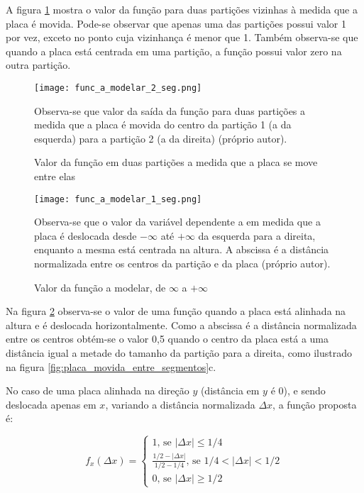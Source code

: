 A figura \ref{fig:func_a_modelar_2_seg} mostra o valor da função para
duas partições vizinhas à medida que a placa é movida. Pode-se observar que
apenas uma das partições possui valor 1 por vez, exceto no ponto cuja vizinhança
é menor que 1. Também observa-se
que quando a placa está centrada em uma partição, a função possui valor zero
na outra partição.

\begin{figure}[!htb]
	\centering
	\texttt{[image: func\_a\_modelar\_2\_seg.png]}
	\caption{Valor da função em duas partições a medida que a placa se move
	entre elas}
	\label{fig:func_a_modelar_2_seg}
	Observa-se que valor da saída da função para duas partições a medida que a
	placa é movida do centro da partição 1 (a da esquerda) para a partição 2 (a
	da direita) (próprio autor).
\end{figure}

\begin{figure}[!htb]
	\centering
	\texttt{[image: func\_a\_modelar\_1\_seg.png]}
	\caption{Valor da função a modelar, de $\infty$ a $+\infty$}
	\label{fig:func_a_modelar_1_seg}
	Observa-se que o valor da variável dependente a em medida que a placa
	é deslocada desde $-\infty$ até $+\infty$ da esquerda para a direita,
	enquanto a mesma está centrada na altura. A abscissa é a distância
	normalizada entre os centros da partição e da placa (próprio autor).
\end{figure}

Na figura \ref{fig:func_a_modelar_1_seg} observa-se o valor de uma função
quando a placa está alinhada na altura e é deslocada horizontalmente. Como
a abscissa é a distância normalizada entre os centros obtém-se o valor 0,5
quando o centro da placa está a uma distância igual a metade do tamanho da
partição para a direita, como ilustrado na figura
\ref{fig:placa_movida_entre_segmentos}c.

No caso de uma placa alinhada na direção $y$ (distância em $y$ é 0), e sendo
deslocada apenas em $x$, variando a distância normalizada $\Delta x$, a função
proposta é:

\begin{equation}
	f_x(\Delta x) = \begin{cases}
		1 \text{, se } |\Delta x| \leq 1/4
		\\
		\frac{1/2-|\Delta x|}{1/2-1/4} \text{, se } 1/4<|\Delta x|<1/2
		\\
		0 \text{, se } |\Delta x| \geq 1/2
	\end{cases}
\end{equation}


